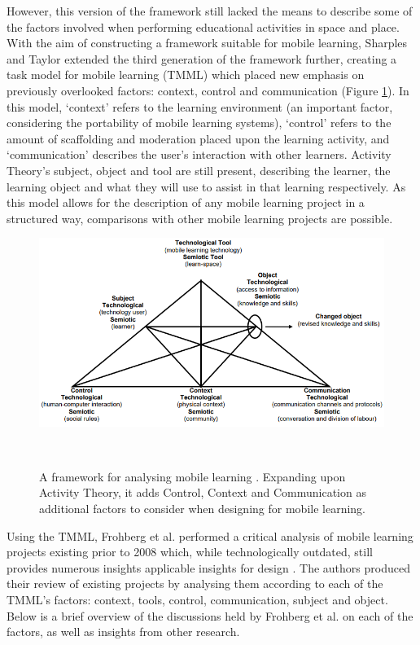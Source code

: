 However, this version of the framework still lacked the means to describe some of the factors involved when performing educational activities in space and place. With the aim of constructing a framework suitable for mobile learning, Sharples and Taylor extended the third generation of the framework further, creating a task model for mobile learning (TMML) which placed new emphasis on previously overlooked factors: context, control and communication \citep{Sharples2007,Taylor2006} (Figure \ref{fig:taskModelMLearning}). In this model, `context' refers to the learning environment (an important factor, considering the portability of mobile learning systems), `control' refers to the amount of scaffolding and moderation placed upon the learning activity, and `communication' describes the user’s interaction with other learners. Activity Theory’s subject, object and tool are still present, describing the learner, the learning object and what they will use to assist in that learning respectively. As this model allows for the description of any mobile learning project in a structured way, comparisons with other mobile learning projects are possible.

\begin{figure}
\centering
  \includegraphics[width=1\columnwidth]{images/chapter03/taskModelForMobileLearning.PNG}
  \caption{A framework for analysing mobile learning \citep{Taylor2006}. Expanding upon Activity Theory, it adds Control, Context and Communication as additional factors to consider when designing for mobile learning.}~\label{fig:taskModelMLearning}
\end{figure}

Using the TMML, Frohberg et al. performed a critical analysis of mobile learning projects existing prior to 2008 which, while technologically outdated, still provides numerous insights applicable insights for design \citep{Frohberg2009}. The authors produced their review of existing projects by analysing them according to each of the TMML's factors: context, tools, control, communication, subject and object. Below is a brief overview of the discussions held by Frohberg et al. on each of the factors, as well as insights from other research.

